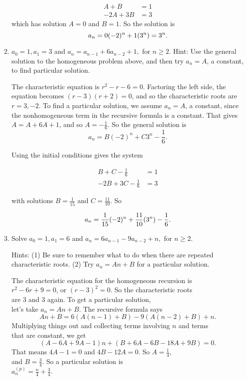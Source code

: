 \documentclass[11pt]{amsart}
\begin{document}
\begin{enumerate}
{\begin{align*}
A + B &= 1\\
-2A + 3B &= 3
\end{align*}
which has solution $A = 0$ and $B=1$. So the solution is 
\[
a_{n} = 0(-2)^{n}+ 1(3^{n}) = 3^n.\\[5pt]
\]
}

\vfill\break

\item $a_0=1, a_1=3$ and $a_n=a_{n-1}+6a_{n-2}+1,$ for $n\geq 2$.
Hint:  Use the general solution to the homogeneous problem above, and then
 try $a_n = A$, a constant, to find particular solution.\\[3pt]
 
 {\color{blue}
The characteristic equation is $r^{2} -r-6 = 0$. Factoring the left side, the equation becomes 
$(r-3)(r+2)=0$, and so the characteristic roots are $r = 3, -2$.  To find a particular solution,
we assume $a_{n}= A$, a constant, since the nonhomogeneous term in the recursive formula 
is a constant. That gives $A = A + 6A + 1$, and so $A = -\frac{1}{6}$. So the general solution is
\[
a_{n} = B(-2)^{n} + C3^{n}-\frac{1}{6}.
\]

Using the initial conditions gives the system

\begin{align*}
B + C-\frac{1}{6} &= 1\\
-2B + 3C-\frac{1}{6} &= 3
\end{align*}

with solutions $B = \frac{1}{15}$ and $C = \frac{11}{10}$. So

\[
a_n = \frac{1}{15}(-2)^n + \frac{11}{10}(3^{n}) - \frac{1}{6}.\\[5pt]
 \]
}
 
\vfill\break

\item Solve  $a_0=1, a_1=6$ and $a_n=6a_{n-1}-9a_{n-2}+n,$ for $n\geq 2$.

Hints: (1) Be sure to remember what to do when there are repeated characteristic roots.
(2) Try $a_n = An + B$ for a particular solution.\\[3pt]

{\color{blue}
The characteristic equation for the homogeneous recursion is \\
$r^2 - 6r +9 =0$, or $(r-3)^2 = 0$. So the characteristic roots\\ 
are $3$ and $3$ again. To get a particular solution,\\ 
let's take $a_n = An+B$. The recursive formula says
\[
An+B = 6(A(n-1)+B) - 9(A(n-2)+B) + n.
\]
Multiplying things out and collecting terms involving $n$ and terms \\
that are constant, we get
\[
(A-6A+9A-1)n + (B+6A -6B -18A +9B) = 0.
\]
That means $4A-1 = 0$ and $4B-12A = 0$. So $\displaystyle A=\frac{1}{4}$,\\
 and $\displaystyle B = \frac{3}{4}$. So a particular solution is\\
 $\displaystyle a^{(p)}_n = \frac{n}{4} + \frac{3}{4}$.

}
\end{enumerate}
\end{document}
